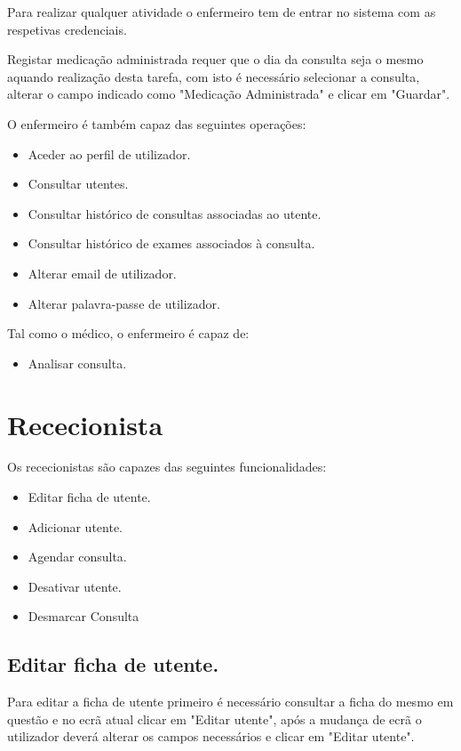 \documentclass[11pt,a4paper,twoside]{article}
\begin{document}
	Para realizar qualquer atividade o enfermeiro tem de entrar no sistema com as respetivas credenciais.
	
	Registar medicação administrada requer que o dia da consulta seja o mesmo aquando realização desta tarefa, com isto é necessário selecionar a consulta, alterar o campo indicado como "Medicação Administrada" e clicar em "Guardar".
	
	O enfermeiro é também capaz das seguintes operações:
	
	\begin{itemize}
		\item Aceder ao perfil de utilizador.
		\item Consultar utentes.
		\item Consultar histórico de consultas associadas ao utente.
		\item Consultar histórico de exames associados à consulta.
		\item Alterar email de utilizador.
		\item Alterar palavra-passe de utilizador.
	\end{itemize}
	
	Tal como o médico, o enfermeiro é capaz de:
	
	\begin{itemize}
		\item Analisar consulta.
	\end{itemize}
	

\section{Rececionista}

Os rececionistas são capazes das seguintes funcionalidades:

\begin{itemize}
	\item Editar ficha de utente.
	\item Adicionar utente.
	\item Agendar consulta.
	\item Desativar utente.
	\item Desmarcar Consulta
\end{itemize}

\subsection{Editar ficha de utente.}
Para editar a ficha de utente primeiro é necessário consultar a ficha do mesmo em questão e no ecrã atual clicar em "Editar utente", após a mudança de ecrã o utilizador deverá alterar os campos necessários e clicar em "Editar utente". 
\end{document}
